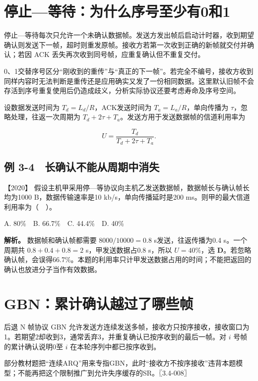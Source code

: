 \section{停止---等待：为什么序号至少有0和1}\label{cn-03-06}

停止---等待每次只允许一个未确认数据帧。发送方发出帧后启动计时器，收到期望确认则发送下一帧，超时则重发原帧。接收方若第一次收到正确的新帧就交付并确认；若因 ACK 丢失再次收到同号帧，应重复确认但不重复交付。

0、1交替序号区分``刚收到的重传''与``真正的下一帧''。若完全不编号，接收方收到同样内容时无法判断是重传还是应用确实又发了一份相同数据。这里默认旧帧不会存活到序号重复使用后仍造成歧义，分析实际协议还要考虑寿命及序号空间。

设数据发送时间为 \(T_d=L_d/R\)，ACK发送时间为 \(T_a=L_a/R\)，单向传播为 \(\tau\)，忽略处理，往返一次周期为 \(T_d+2\tau+T_a\)。发送方用于发送数据帧的信道利用率为

\[U=\frac{T_d}{T_d+2\tau+T_a}.\]

\subsection{例 3-4　长确认不能从周期中消失}\label{cn-ex3-4}

\noindent{}【2020】 假设主机甲采用停---等协议向主机乙发送数据帧，数据帧长与确认帧长均为1000 B，数据传输速率是10 kb/s，单向传播延时是200 ms。则甲的最大信道利用率为（　）。

A. 80\%　B. 66.7\%　C. 44.4\%　D. 40\%


\textbf{解析。} 数据帧和确认帧都需要 \(8000/10000=0.8\) s发送，往返传播为0.4 s。一个周期共 \(0.8+0.4+0.8=2\) s，甲发送数据占0.8 s，所以 \(U=40\%\)，选 \textbf{D}。若忽略确认帧，会误得66.7\%。本题的利用率只计甲发送数据占用的时间；不能把返回的确认也放进分子当作有效数据。

\section{GBN：累计确认越过了哪些帧}\label{cn-03-07}

后退 N 帧协议 GBN 允许发送方连续发送多帧，接收方只按序接收，接收窗口为1。若期望2却收到3，通常丢弃3，并重复确认已按序收到的最后一帧。对 \(i\) 号帧的累计确认说明0至 \(i\) 在本轮序列中都已按序收到。

部分教材题把``连续ARQ''用来专指GBN，此时``接收方不按序接收''违背本题模型；不能再把这个限制推广到允许失序缓存的SR。〖3.4-008〗

